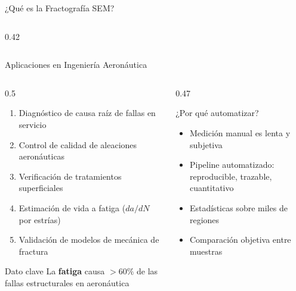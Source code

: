 \documentclass[aspectratio=169,12pt]{beamer}
\begin{document}
\begin{frame}{¿Qué es la Fractografía SEM?}
\begin{columns}
\begin{column}{0.42\textwidth}
		\end{column}
	\end{columns}
\end{frame}

\begin{frame}{Aplicaciones en Ingeniería Aeronáutica}
	\begin{columns}
		\begin{column}{0.5\textwidth}
			\begin{enumerate}\small
				\item Diagnóstico de causa raíz de fallas en servicio
				\item Control de calidad de aleaciones aeronáuticas
				\item Verificación de tratamientos superficiales
				\item Estimación de vida a fatiga ($da/dN$ por estrías)
				\item Validación de modelos de mecánica de fractura
			\end{enumerate}
			\vspace{0.3em}
			\begin{exampleblock}{Dato clave}
				La \textbf{fatiga} causa $>60\%$ de las fallas
				estructurales en aeronáutica
			\end{exampleblock}
		\end{column}
		\begin{column}{0.47\textwidth}
			\begin{alertblock}{¿Por qué automatizar?}
				\begin{itemize}\small
					\item Medición manual es lenta y subjetiva
					\item Pipeline automatizado: reproducible,
					      trazable, cuantitativo
					\item Estadísticas sobre miles de regiones
					\item Comparación objetiva entre muestras
				\end{itemize}
			\end{alertblock}
		\end{column}
	\end{columns}
\end{frame}
\end{document}
